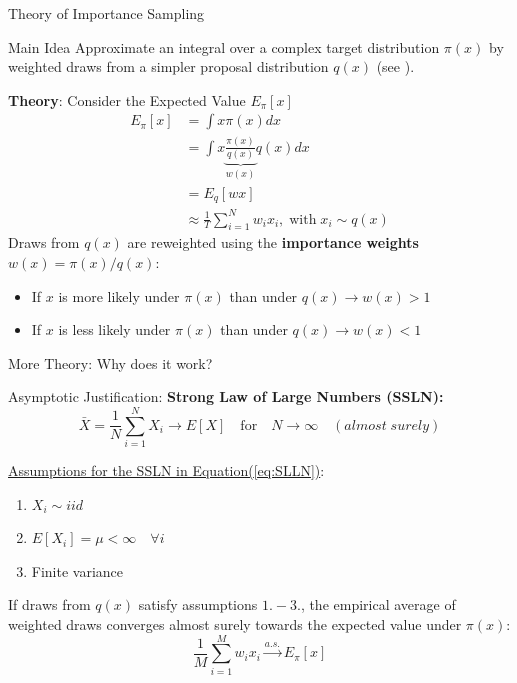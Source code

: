 \documentclass[10pt]{beamer}
\begin{document}
\begin{frame}{Theory of Importance Sampling}
\label{IS}
\begin{alertblock}{Main Idea}
Approximate an integral over a complex target distribution $\pi(x)$ by weighted draws from a simpler proposal distribution $q(x)$ (see \cite{Doucet2001}).
\end{alertblock}

\textbf{Theory}: Consider the Expected Value $E_{\pi}[x]$
\begin{align*}
				E_{\pi}[x] &= \int x\pi(x)dx \\
				&= \int x\underbrace{\frac{\pi(x)}{q(x)}}_{w(x)}q(x) dx \\
				&= E_{q}[wx] \\
				&\approx \frac{1}{T}\sum_{i=1}^{N} w_i x_i, \; \text{with} \; x_i \sim q(x)
\end{align*}
\hspace{0.3cm}
Draws from $q(x)$ are reweighted using the \textbf{importance weights} $w(x) = \pi(x)/q(x)$:
\begin{itemize}
    \item If $x$ is more likely under $\pi(x)$ than under $q(x) \longrightarrow w(x) > 1$
    \item If $x$ is less likely under $\pi(x)$ than under $q(x) \longrightarrow w(x) < 1$
\end{itemize}

\end{frame}

\begin{frame}{More Theory: Why does it work?}
\begin{alertblock}{Asymptotic Justification:}
\textbf{Strong Law of Large Numbers (SSLN):}  
\begin{equation}\label{eq:SLLN}
    \bar{X} = \frac{1}{N} \sum_{i=1}^{N} X_i \rightarrow E[X] \quad \text{for} \quad N \rightarrow \infty \quad (almost \; surely)
\end{equation}
\end{alertblock}
\underline{Assumptions for the SSLN in Equation(\ref{eq:SLLN})}:
\begin{enumerate}
    \item $X_i \sim iid$ \checkmark
    \item $E[X_i] = \mu < \infty \quad \forall i$ \checkmark
    \item Finite variance \checkmark
\end{enumerate}
If draws from $q(x)$ satisfy assumptions $1.-3.$, the empirical average of weighted draws converges almost surely towards the expected value under $\pi(x)$: $$\frac{1}{M} \sum_{i=1}^{M} w_i x_i \xrightarrow[]{a.s.} E_{\pi}[x]$$ 
\end{frame}
\end{document}
